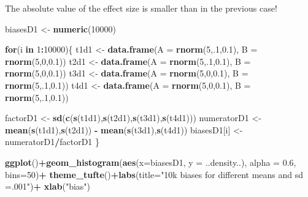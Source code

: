 \documentclass[10pt,dvipsnames,enabledeprecatedfontcommands]{scrartcl}
\newenvironment{Shaded}{\begin{snugshade}}{\end{snugshade}}
\newcommand{\KeywordTok}[1]{\textcolor[rgb]{0.13,0.29,0.53}{\textbf{#1}}}
\newcommand{\DataTypeTok}[1]{\textcolor[rgb]{0.13,0.29,0.53}{#1}}
\newcommand{\DecValTok}[1]{\textcolor[rgb]{0.00,0.00,0.81}{#1}}
\newcommand{\FloatTok}[1]{\textcolor[rgb]{0.00,0.00,0.81}{#1}}
\newcommand{\StringTok}[1]{\textcolor[rgb]{0.31,0.60,0.02}{#1}}
\newcommand{\ControlFlowTok}[1]{\textcolor[rgb]{0.13,0.29,0.53}{\textbf{#1}}}
\newcommand{\OperatorTok}[1]{\textcolor[rgb]{0.81,0.36,0.00}{\textbf{#1}}}
\newcommand{\NormalTok}[1]{#1}
\begin{document}
\noindent The absolute value of the effect size is smaller than in the
previous case!

\vspace{1mm} \footnotesize

\begin{Shaded}
\begin{Highlighting}[]
\NormalTok{biasesD1 <-}\StringTok{ }\KeywordTok{numeric}\NormalTok{(}\DecValTok{10000}\NormalTok{)}

\ControlFlowTok{for}\NormalTok{(i }\ControlFlowTok{in} \DecValTok{1}\OperatorTok{:}\DecValTok{10000}\NormalTok{)\{}
\NormalTok{t1d1 <-}\StringTok{ }\KeywordTok{data.frame}\NormalTok{(}\DataTypeTok{A  =} \KeywordTok{rnorm}\NormalTok{(}\DecValTok{5}\NormalTok{,.}\DecValTok{1}\NormalTok{,}\FloatTok{0.1}\NormalTok{), }\DataTypeTok{B =} \KeywordTok{rnorm}\NormalTok{(}\DecValTok{5}\NormalTok{,}\DecValTok{0}\NormalTok{,}\FloatTok{0.1}\NormalTok{))}
\NormalTok{t2d1 <-}\StringTok{ }\KeywordTok{data.frame}\NormalTok{(}\DataTypeTok{A  =} \KeywordTok{rnorm}\NormalTok{(}\DecValTok{5}\NormalTok{,.}\DecValTok{1}\NormalTok{,}\FloatTok{0.1}\NormalTok{), }\DataTypeTok{B =} \KeywordTok{rnorm}\NormalTok{(}\DecValTok{5}\NormalTok{,}\DecValTok{0}\NormalTok{,}\FloatTok{0.1}\NormalTok{))}
\NormalTok{t3d1 <-}\StringTok{ }\KeywordTok{data.frame}\NormalTok{(}\DataTypeTok{A  =} \KeywordTok{rnorm}\NormalTok{(}\DecValTok{5}\NormalTok{,}\DecValTok{0}\NormalTok{,}\FloatTok{0.1}\NormalTok{), }\DataTypeTok{B =} \KeywordTok{rnorm}\NormalTok{(}\DecValTok{5}\NormalTok{,.}\DecValTok{1}\NormalTok{,}\FloatTok{0.1}\NormalTok{))}
\NormalTok{t4d1 <-}\StringTok{ }\KeywordTok{data.frame}\NormalTok{(}\DataTypeTok{A  =} \KeywordTok{rnorm}\NormalTok{(}\DecValTok{5}\NormalTok{,}\DecValTok{0}\NormalTok{,}\FloatTok{0.1}\NormalTok{), }\DataTypeTok{B =} \KeywordTok{rnorm}\NormalTok{(}\DecValTok{5}\NormalTok{,.}\DecValTok{1}\NormalTok{,}\FloatTok{0.1}\NormalTok{))}

\NormalTok{factorD1 <-}\StringTok{ }\KeywordTok{sd}\NormalTok{(}\KeywordTok{c}\NormalTok{(}\KeywordTok{s}\NormalTok{(t1d1),}\KeywordTok{s}\NormalTok{(t2d1),}\KeywordTok{s}\NormalTok{(t3d1),}\KeywordTok{s}\NormalTok{(t4d1)))}
\NormalTok{numeratorD1 <-}\StringTok{  }\KeywordTok{mean}\NormalTok{(}\KeywordTok{s}\NormalTok{(t1d1),}\KeywordTok{s}\NormalTok{(t2d1)) }\OperatorTok{-}\StringTok{ }\KeywordTok{mean}\NormalTok{(}\KeywordTok{s}\NormalTok{(t3d1),}\KeywordTok{s}\NormalTok{(t4d1))}
\NormalTok{biasesD1[i] <-}\StringTok{ }\NormalTok{numeratorD1}\OperatorTok{/}\NormalTok{factorD1}
\NormalTok{\}}

\KeywordTok{ggplot}\NormalTok{()}\OperatorTok{+}\KeywordTok{geom_histogram}\NormalTok{(}\KeywordTok{aes}\NormalTok{(}\DataTypeTok{x=}\NormalTok{biasesD1, }\DataTypeTok{y =}\NormalTok{ ..density..), }\DataTypeTok{alpha =} \FloatTok{0.6}\NormalTok{, }\DataTypeTok{bins=}\DecValTok{50}\NormalTok{)}\OperatorTok{+}
\StringTok{  }\KeywordTok{theme_tufte}\NormalTok{()}\OperatorTok{+}\KeywordTok{labs}\NormalTok{(}\DataTypeTok{title=}\StringTok{"10k biases for different means and sd =.001"}\NormalTok{)}\OperatorTok{+}\StringTok{ }\KeywordTok{xlab}\NormalTok{(}\StringTok{"bias"}\NormalTok{)}
\end{Highlighting}
\end{Shaded}
\end{document}
